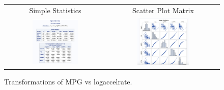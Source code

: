 \documentclass[acmsmall]{acmart}
\begin{document}
\begin{figure}[H] %
	\centering
	\begin{tabular}{p{} p{}}
	\hline
	\multicolumn{1}{|c|}{Simple Statistics} & \multicolumn{1}{|c|}{Scatter Plot Matrix} \\
		\multicolumn{1}{|c|}{\includegraphics[width=0.48\textwidth]{../graphics/Pearsonlogacc1}} &
		\multicolumn{1}{|c|}{\includegraphics[width=0.48\textwidth]{../graphics/Pearsonlogacc2}}\\
		\hline
	\end{tabular}		
	\caption{Transformations of MPG vs logaccelrate.} %
	\label{fig:TFLAPC}
\end{figure}
\end{document}

